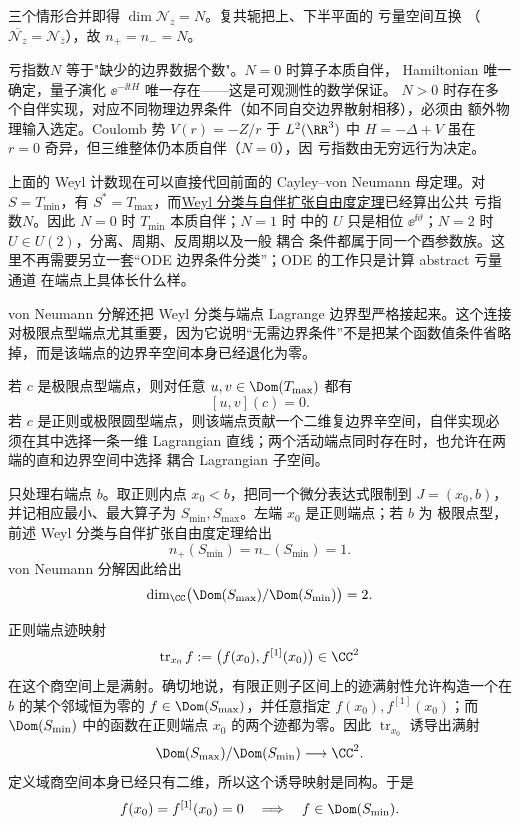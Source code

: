 三个情形合并即得 $\dim\mathcal N_z=N$。复共轭把上、下半平面的 亏量空间互换
（$\overline{\mathcal N_z}=\mathcal N_{\overline z}$），故 $n_+=n_-=N$。

亏指数$N$ 等于"缺少的边界数据个数"。$N=0$ 时算子本质自伴，
Hamiltonian 唯一确定，量子演化 $\ee^{-\ii tH}$ 唯一存在——这是可观测性的数学保证。
$N>0$ 时存在多个自伴实现，对应不同物理边界条件（如不同自交边界散射相移），必须由
额外物理输入选定。Coulomb 势 $V(r)=-Z/r$ 于 $L^2(\RR^3)$ 中 $H=-\Delta+V$ 虽在 $r=0$
奇异，但三维整体仍本质自伴（$N=0$），因 亏指数由无穷远行为决定。

上面的 Weyl 计数现在可以直接代回前面的 Cayley--von Neumann 母定理。对 $S=T_{\min}$，有 $S^*=T_{\max}$，而\hyperref[thm:math-sl-weyl-extension-count]{Weyl 分类与自伴扩张自由度定理}已经算出公共 亏指数$N$。因此 $N=0$ 时 $T_{\min}$ 本质自伴；$N=1$ 时 中的 $U$ 只是相位 $\ee^{\ii\vartheta}$；$N=2$ 时 $U\in U(2)$，分离、周期、反周期以及一般 耦合 条件都属于同一个酉参数族。这里不再需要另立一套“ODE 边界条件分类”；ODE 的工作只是计算 abstract 亏量 通道 在端点上具体长什么样。

von Neumann 分解还把 Weyl 分类与端点 Lagrange 边界型严格接起来。这个连接对极限点型端点尤其重要，因为它说明“无需边界条件”不是把某个函数值条件省略掉，而是该端点的边界辛空间本身已经退化为零。

\begin{theorem}\label{thm:math-sl-limit-point-boundary-form}
若 $c$ 是极限点型端点，则对任意 $u,v\in\Dom(T_{\max})$ 都有
\[
 [u,v](c)=0.
\]
若 $c$ 是正则或极限圆型端点，则该端点贡献一个二维复边界辛空间，自伴实现必须在其中选择一条一维 Lagrangian 直线；两个活动端点同时存在时，也允许在两端的直和边界空间中选择 耦合 Lagrangian 子空间。
\end{theorem}

只处理右端点 $b$。取正则内点 $x_0<b$，把同一个微分表达式限制到 $J=(x_0,b)$，并记相应最小、最大算子为 $S_{\min},S_{\max}$。左端 $x_0$ 是正则端点；若 $b$ 为 极限点型，前述 Weyl 分类与自伴扩张自由度定理给出
\[
 n_+(S_{\min})=n_-(S_{\min})=1.
\]
von Neumann 分解因此给出
\[
 \dim_\CC\bigl(\Dom(S_{\max})/\Dom(S_{\min})\bigr)=2.
\]

正则端点迹映射
\[
 \operatorname{tr}_{x_0}f
 :=\bigl(f(x_0),f^{[1]}(x_0)\bigr)\in\CC^2
\]
在这个商空间上是满射。确切地说，有限正则子区间上的迹满射性允许构造一个在 $b$ 的某个邻域恒为零的 $f\in\Dom(S_{\max})$，并任意指定 $f(x_0),f^{[1]}(x_0)$；而 $\Dom(S_{\min})$ 中的函数在正则端点 $x_0$ 的两个迹都为零。因此 $\operatorname{tr}_{x_0}$ 诱导出满射
\[
 \Dom(S_{\max})/\Dom(S_{\min})\longrightarrow\CC^2.
\]
定义域商空间本身已经只有二维，所以这个诱导映射是同构。于是
\[
 f(x_0)=f^{[1]}(x_0)=0
 \quad\Longrightarrow\quad
 f\in\Dom(S_{\min}).
\]

